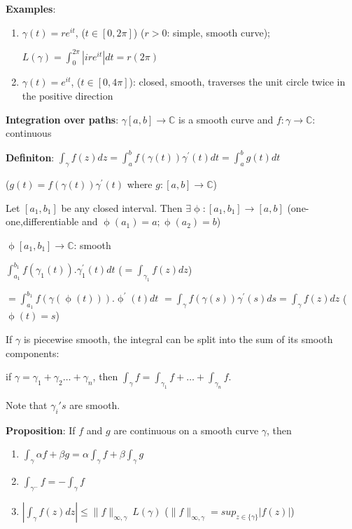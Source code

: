 \documentclass{article}
\begin{document}
\begin{flushleft}
\textbf{Examples}:
\begin{enumerate}
    \item $\gamma(t)=re^{it}$, ($t\in [0,2\pi]$) ($r>0$: simple, smooth curve); 
    
    $L(\gamma)=\int_{0}^{2\pi} |ire^{it}| dt= r(2\pi)$
    
    \item $\gamma(t)=e^{it}$, ($t \in [0,4\pi]$): closed, smooth, traverses the unit circle twice in the positive direction
\end{enumerate}
\textbf{Integration over paths}:
$\gamma[a,b]\rightarrow \mathds{C}$ is a smooth curve and $f:\gamma \rightarrow \mathds{C}$: continuous 

\textbf{Definiton}: $\int_{\gamma}^{} f(z) dz= \int_{a}^{b} f(\gamma(t)) \gamma^{'}(t) dt=\int_{a}^{b}g(t) dt$ 

($g(t)=f(\gamma(t)) \gamma^{'}(t)$ where $g:[a,b]\rightarrow \mathds{C}$)

Let $[a_1,b_1]$ be any closed interval. Then $\exists \upphi:[a_1,b_1]\rightarrow [a,b]$ (one-one,differentiable and $\upphi(a_1)=a;\upphi(a_2)=b$)

$\upphi[a_1,b_1] \rightarrow \mathds{C}$: smooth 

$\int_{a_1}^{b_1}f(\gamma_1(t)).\gamma_1^{'}(t)dt$ \: ($=\int_{\gamma_1}^{}f(z) dz$)

$=\int_{a_1}^{b_1}f(\gamma(\upphi(t))).\upphi^{'}(t) dt$
$=\int_{\gamma}^{} f(\gamma(s)) \gamma^{'}(s) ds=\int_{\gamma}^{}f(z) dz$ \: ($\upphi(t)=s$)

If $\gamma$ is piecewise smooth, the integral can be split into the sum of its smooth components:

if $\gamma=\gamma_1+\gamma_2 \dots +\gamma_n$, then $\int_{\gamma}^{} f = \int_{\gamma_1}^{} f + \dots + \int_{\gamma_n}^{} f$.

Note that $\gamma_i's$ are smooth.

\textbf{Proposition}: If $f$ and $g$ are continuous on a smooth curve $\gamma$, then 
\begin{enumerate}
    \item $\int_{\gamma}^{} \alpha f+\beta g = \alpha \int_{\gamma}^{} f + \beta\int_{\gamma}^{} g$
    \item $\int_{\gamma^{-}}^{} f = - \int_{\gamma}^{} f$
    \item $|\int_{\gamma}^{} f(z) dz| \leq \|f\|_{\infty,\gamma} \: L(\gamma)$ \: ($\|f\|_{\infty,\gamma}=sup_{z\in \{\gamma\}}|f(z)|$)
\end{enumerate}


\end{flushleft}
\end{document}
